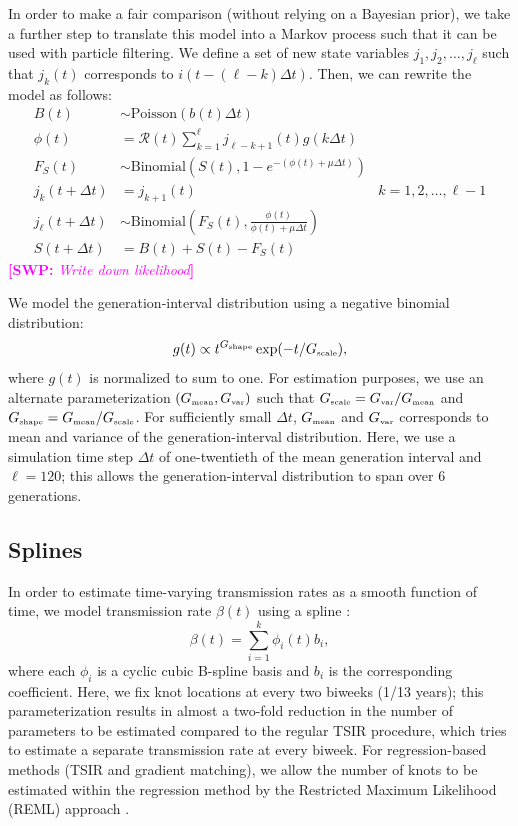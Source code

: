 \documentclass{article}
\newcommand{\comment}[3]{\textcolor{#1}{\textbf{[#2: }\textsl{#3}\textbf{]}}}
\newcommand{\swp}[1]{\comment{magenta}{SWP}{#1}}
\newcommand{\tsub}[2]{#1_{{\textrm{\tiny #2}}}}
\begin{document}
In order to make a fair comparison (without relying on a Bayesian prior), we take a further step to translate this model into a Markov process such that it can be used with particle filtering.
We define a set of new state variables $j_1, j_2, \dots, j_\ell$ such that $j_k(t)$ corresponds to $i(t- (\ell-k) \Delta t)$.
Then, we can rewrite the model as follows:
\begin{equation}
\begin{aligned}
B(t) &\sim \mathrm{Poisson}(b(t) \Delta t)\\
\phi(t) &= \mathcal R(t) \sum_{k=1}^\ell j_{\ell-k+1}(t) g(k \Delta t)\\
F_{S}(t) &\sim \mathrm{Binomial}\left(S(t), 1 - e^{-(\phi(t) + \mu \Delta t)} \right)\\
j_k(t+\Delta t) &= j_{k+1}(t) &k=1, 2, \dots, \ell-1\\
j_\ell(t + \Delta t) &\sim \mathrm{Binomial}\left(F_{S}(t), \frac{\phi(t)}{\phi(t) + \mu \Delta t} \right)\\
S(t + \Delta t) &= B(t) + S(t) - F_{S}(t)
\end{aligned}
\end{equation}
\swp{Write down likelihood}

We model the generation-interval distribution using a negative binomial distribution:
\begin{equation}
g(t) \propto t^{\tsub{G}{shape}} \exp(-t/\tsub{G}{scale}),
\end{equation}
where $g(t)$ is normalized to sum to one.
For estimation purposes, we use an alternate parameterization $(\tsub{G}{mean}, \tsub{G}{var})$ such that $\tsub{G}{scale} = \tsub{G}{var}/\tsub{G}{mean}$ and $\tsub{G}{shape} = \tsub{G}{mean}/\tsub{G}{scale}$.
For sufficiently small $\Delta t$, $\tsub{G}{mean}$ and $\tsub{G}{var}$ corresponds to mean and variance of the generation-interval distribution.
Here, we use a simulation time step $\Delta t$ of one-twentieth of the mean generation interval and $\ell = 120$; this allows the generation-interval distribution to span over 6 generations.

\subsection{Splines}

In order to estimate time-varying transmission rates as a smooth function of time, we model transmission rate $\beta(t)$ using a spline \citep{hooker2010parameterizing}:
\begin{equation}
\beta(t) = \sum_{i=1}^k \phi_i(t) b_i,
\end{equation}
where each $\phi_i$ is a cyclic cubic B-spline basis and $b_i$ is the corresponding coefficient.
Here, we fix knot locations at every two biweeks (1/13 years);
this parameterization results in almost a two-fold reduction in the number of parameters to be estimated compared to the regular TSIR procedure, which tries to estimate a separate transmission rate at every biweek.
For regression-based methods (TSIR and gradient matching), we allow the number of knots to be estimated within the regression method by the Restricted Maximum Likelihood (REML) approach \citep{wood2012mgcv}.
\end{document}
